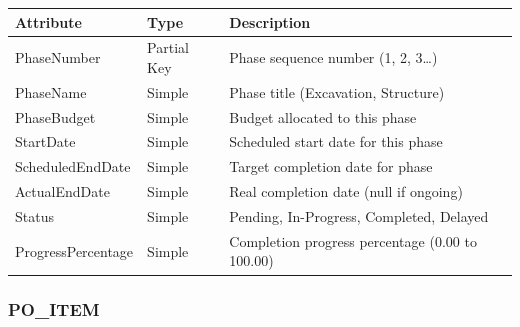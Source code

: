 \documentclass[a4paper,12pt]{report}
\newcounter{none} %
\begin{document}
{\def\LTcaptype{none} %
\begin{longtable}[]{@{}
  >{\raggedright\arraybackslash}p{}
  >{\raggedright\arraybackslash}p{}
  >{\raggedright\arraybackslash}p{}@{}}
\toprule\noalign{}
\begin{minipage}[b]{\linewidth}\raggedright
Attribute
\end{minipage} & \begin{minipage}[b]{\linewidth}\raggedright
Type
\end{minipage} & \begin{minipage}[b]{\linewidth}\raggedright
Description
\end{minipage} \\
\midrule\noalign{}
\endhead
\bottomrule\noalign{}
\endlastfoot
PhaseNumber & Partial Key & Phase sequence number (\allowbreak{}1, 2, 3\ldots) \\
PhaseName & Simple & Phase title (\allowbreak{}Excavation, Structure) \\
PhaseBudget & Simple & Budget allocated to this phase \\
StartDate & Simple & Scheduled start date for this phase \\
ScheduledEndDate & Simple & Target completion date for phase \\
ActualEndDate & Simple & Real completion date (\allowbreak{}null if ongoing) \\
Status & Simple & Pending, In-Progress, Completed, Delayed \\
ProgressPercentage & Simple & Completion progress percentage (\allowbreak{}0.00 to 100.00) \\
\end{longtable}
}

\subsubsection{\texorpdfstring{PO\texorpdfstring{\_\allowbreak{}}{_}ITEM}{POITEM}}\label{po_item}
\end{document}
